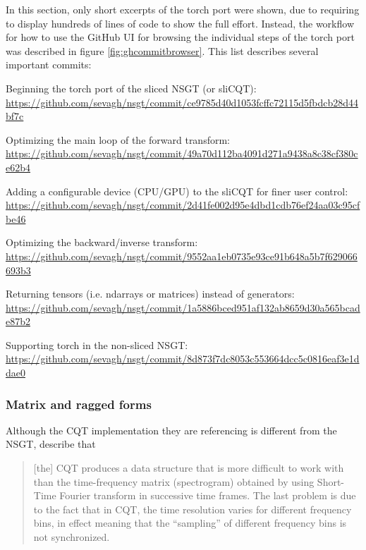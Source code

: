 \documentclass[report.tex]{subfiles}
\begin{document}
In this section, only short excerpts of the torch port were shown, due to requiring to display hundreds of lines of code to show the full effort. Instead, the workflow for how to use the GitHub UI for browsing the individual steps of the torch port was described in figure \ref{fig:ghcommitbrowser}. This list describes several important commits:

\begin{tight_enumerate}
	 \item
		 Beginning the torch port of the sliced NSGT (or sliCQT):\\
		 {\scriptsize \url{https://github.com/sevagh/nsgt/commit/ce9785d40d1053fcffc72115d5fbdcb28d44bf7c}}
	 \item
		 Optimizing the main loop of the forward transform:\\
		 {\scriptsize \url{https://github.com/sevagh/nsgt/commit/49a70d112ba4091d271a9438a8c38cf380ce62b4}}
	 \item
		 Adding a configurable device (CPU/GPU) to the sliCQT for finer user control:\\
		 {\scriptsize \url{https://github.com/sevagh/nsgt/commit/2d41fe002d95e4dbd1cdb76ef24aa03c95cfbe46}}
	 \item
		 Optimizing the backward/inverse transform:\\
		 {\scriptsize \url{https://github.com/sevagh/nsgt/commit/9552aa1eb0735e93ce91b648a5b7f629066693b3}}
	 \item
		 Returning tensors (i.e. ndarrays or matrices) instead of generators:\\
		 {\scriptsize \url{https://github.com/sevagh/nsgt/commit/1a5886bced951af132ab8659d30a565bcade87b2}}
	 \item
	 	 Supporting torch in the non-sliced NSGT:\\
	 	 {\scriptsize \url{https://github.com/sevagh/nsgt/commit/8d873f7dc8053c553664dcc5c0816eaf3e1ddae0}}
\end{tight_enumerate}

\newpagefill

\subsubsection{Matrix and ragged forms}
\label{sec:matrixvragged}

Although the CQT implementation they are referencing is different from the NSGT, \textcite[1]{klapuricqt} describe that
\begin{quote}
	[the] CQT produces a data structure that is more difficult to work with than the time-frequency matrix (spectrogram) obtained by using Short-Time Fourier transform in successive time frames. The last problem is due to the fact that in CQT, the time resolution varies for different frequency bins, in effect meaning that the ``sampling'' of different frequency bins is not synchronized.
\end{quote}
\end{document}
